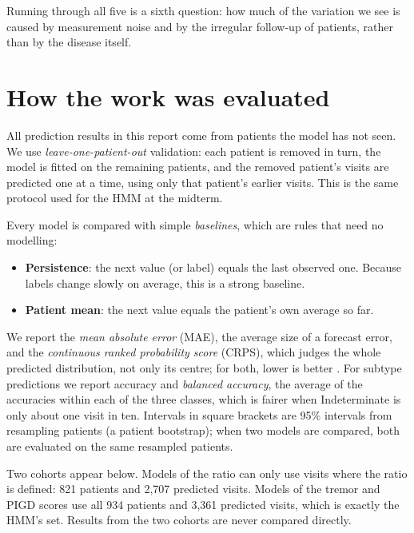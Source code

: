 \documentclass[11pt,a4paper]{article}
\begin{document}
Running through all five is a sixth question: how much of the variation we see
is caused by measurement noise and by the irregular follow-up of patients,
rather than by the disease itself.

\section{How the work was evaluated}

All prediction results in this report come from patients the model has not
seen. We use \emph{leave-one-patient-out} validation: each patient is removed
in turn, the model is fitted on the remaining patients, and the removed
patient's visits are predicted one at a time, using only that patient's earlier
visits. This is the same protocol used for the HMM at the midterm.

Every model is compared with simple \emph{baselines}, which are rules that need
no modelling:

\begin{itemize}
  \item \textbf{Persistence}: the next value (or label) equals the last observed
        one. Because labels change slowly on average, this is a strong
        baseline.
  \item \textbf{Patient mean}: the next value equals the patient's own average so
        far.
\end{itemize}

We report the \emph{mean absolute error} (MAE), the average size of a forecast
error, and the \emph{continuous ranked probability score} (CRPS), which judges
the whole predicted distribution, not only its centre; for both, lower is
better \cite{gneiting}. For subtype predictions we report accuracy and
\emph{balanced accuracy}, the average of the accuracies within each of the
three classes, which is fairer when Indeterminate is only about one visit in
ten. Intervals in square brackets are 95\% intervals from resampling patients
(a patient bootstrap); when two models are compared, both are evaluated on the
same resampled patients.

Two cohorts appear below. Models of the ratio can only use visits where the
ratio is defined: 821 patients and 2,707 predicted visits. Models of the
tremor and PIGD scores use all 934 patients and 3,361 predicted visits, which
is exactly the HMM's set. Results from the two cohorts are never compared
directly.
\end{document}
